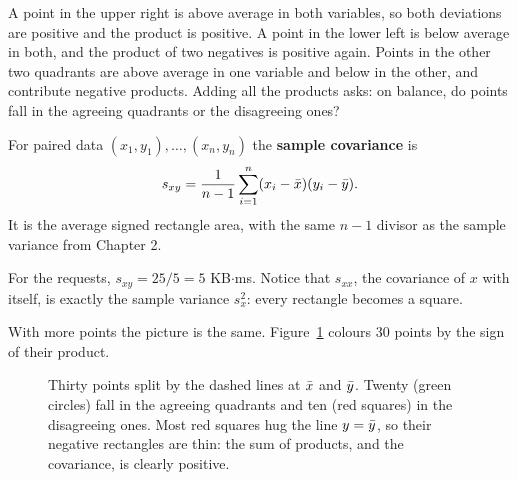 A point in the upper right is above average in both variables, so both deviations
are positive and the product is positive. A point in the lower left is below
average in both, and the product of two negatives is positive again. Points in the
other two quadrants are above average in one variable and below in the other, and
contribute negative products. Adding all the products asks: on balance, do points
fall in the agreeing quadrants or the disagreeing ones?

\begin{definition}
For paired data $(x_1,y_1),\dots,(x_n,y_n)$ the \textbf{sample covariance} is
\[
  s_{xy} = \frac{1}{n-1}\sum_{i=1}^{n}(x_i-\bar{x})(y_i-\bar{y}).
\]
It is the average signed rectangle area, with the same $n-1$ divisor as the sample
variance from Chapter 2.
\end{definition}

For the requests, $s_{xy} = 25/5 = 5$ KB$\cdot$ms. Notice that $s_{xx}$, the
covariance of $x$ with itself, is exactly the sample variance $s_x^2$: every
rectangle becomes a square.

With more points the picture is the same. Figure~\ref{fig:two-variables-quadrant}
colours 30 points by the sign of their product.

\begin{figure}[H]
\centering
{}
\caption{Thirty points split by the dashed lines at $\bar{x}$ and $\bar{y}$. Twenty
(green circles) fall in the agreeing quadrants and ten (red squares) in the
disagreeing ones. Most red squares hug the line $y = \bar{y}$, so their negative
rectangles are thin: the sum of products, and the covariance, is clearly
positive.}
\label{fig:two-variables-quadrant}
\end{figure}

